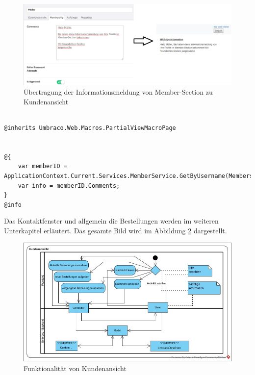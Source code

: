 \begin{figure}[h]
	\centering
	\includegraphics[width=1\linewidth]{Graphics/kundenAnsichtWichtInf.png}
	\caption[Kundeansicht]{Übertragung der Informationsmeldung von Member-Section zu Kundenansicht}
	\label{fig:kundenAnsichtWichtInf}
\end{figure}
\pagebreak
\begin{lstlisting}[caption={Macro zum Kundenansicht}, label=lst:macroKundenansicht]

@inherits Umbraco.Web.Macros.PartialViewMacroPage


@{
	var memberID = ApplicationContext.Current.Services.MemberService.GetByUsername(Membership.GetUser().UserName);
	var info = memberID.Comments;
}
@info
\end{lstlisting}

Das Kontaktfenster und allgemein die Bestellungen werden im weiteren Unterkapitel erläutert. Das gesamte Bild wird im Abbildung \ref{fig:KundenansichtNeu} dargestellt.

\begin{figure}[h]
	\centering
	\includegraphics[width=1\linewidth]{Graphics/KundenansichtNeu.jpg}
	\caption[Funktionalität von Kundenansicht]{Funktionalität von Kundenansicht}
	\label{fig:KundenansichtNeu}
\end{figure}

